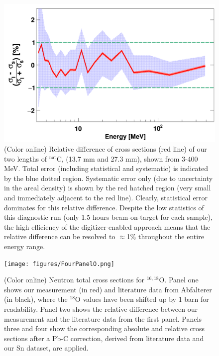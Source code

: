 \documentclass[twocolumn,secnumarabic,amssymb, nobibnotes, aps, prl,
superscriptaddress, nobalancelastpage]{revtex4}
\begin{document}
\begin{figure}
    \includegraphics[scale=0.30]{figures/relativeDiff_longCarbonShortCarbon.png}
    \caption{(Color online) Relative difference of cross sections (red line) of
        our two lengths of $^{\text{nat}}$C, (13.7 mm and 27.3 mm), shown from 3-400
        MeV. Total error
        (including statistical and systematic) is indicated by the blue
        dotted region. Systematic error only (due to uncertainty in the areal
        density) is shown by the red hatched region (very small and immediately adjacent to 
        the red line). Clearly, statistical error dominates for this relative
        difference.
        Despite the low statistics of this diagnostic run (only 1.5 hours
        beam-on-target for each sample), the high efficiency of the
        digitizer-enabled approach means that the relative difference can be resolved to 
        $\approx$1\% throughout the entire energy range.
    }
    \label{CarbonBenchmarking}
\end{figure}


\begin{figure}
    \texttt{[image: figures/FourPanelO.png]}
    \caption{(Color online) Neutron total cross sections for $^{16,18}$O.
     Panel one shows our measurement (in red) and literature data from
     Abfalterer (in
     black), where the $^{18}$O values have been shifted up by 1 barn for
     readability. Panel two shows the relative difference between our 
     measurement and the literature data from the first panel. Panels three and
     four show the corresponding absolute and relative cross sections after a
     Pb-C correction, derived from literature data and our Sn dataset,
     are applied.
    }
\end{figure}
\end{document}
